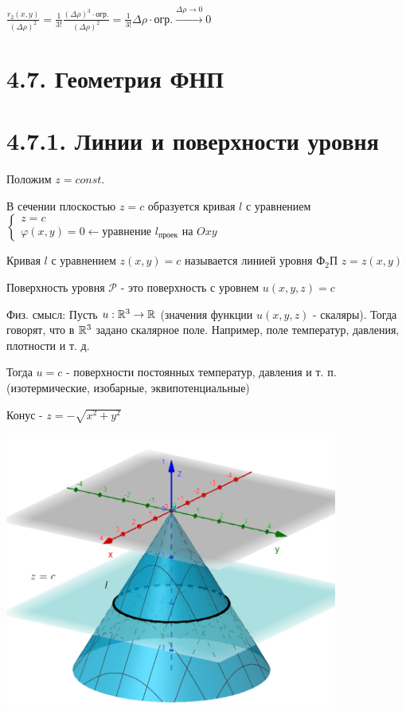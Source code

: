 \documentclass[12pt]{article}
\begin{document}
    $\frac{r_2(x, y)}{(\Delta \rho)^2} = \frac{1}{3!} \frac{(\Delta \rho)^3 \cdot \text{огр.}}{(\Delta \rho)^2} = \frac{1}{3!} \Delta \rho \cdot \text{огр.} \stackrel{\Delta \rho \to 0}{\rightarrow} 0$

    \section{4.7. Геометрия ФНП}


    \section{4.7.1. Линии и поверхности уровня}

    Положим $z = const$.

    В сечении плоскостью $z = c$ образуется кривая $l$ с уравнением $\begin{cases}z = c \\ \varphi(x, y) = 0 \leftarrow \text{уравнение $l_\text{проек}$ на $Oxy$}\end{cases}$

    Кривая $l$ с уравнением $z(x, y) = c$ называется линией уровня Ф$_2$П $z = z(x, y)$

    \Def Поверхность уровня $\mathcal{P}$ - это поверхность с уровнем $u(x, y, z) = c$

    Физ. смысл: Пусть $u : \mathbb{R}^3 \rightarrow \mathbb{R}$ (значения функции $u(x, y, z)$ - скаляры).
    Тогда говорят, что в $\mathbb{R}^3$ задано скалярное поле.
    Например, поле температур, давления, плотности и т. д.

    Тогда $u = c$ - поверхности постоянных температур, давления и т. п. (изотермические, изобарные, эквипотенциальные)

    \Ex Конус - $z = -\sqrt{x^2 + y^2}$

    \includegraphics[height=90mm]{calculus/images/calculus_2024_03_13_1}
\end{document}
